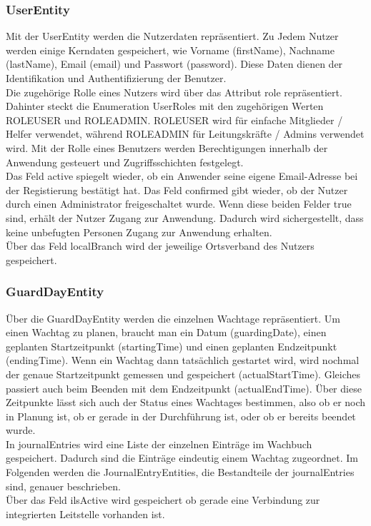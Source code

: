 \documentclass[fontsize=12pt,openright,oneside,paper=a4,BCOR=1cm]{scrbook}
\begin{document}
\subsubsection{UserEntity}
Mit der \glqq UserEntity\grqq{} werden die Nutzerdaten repräsentiert. Zu Jedem Nutzer werden einige Kerndaten gespeichert, wie Vorname (\glqq firstName\grqq{}), Nachname (\glqq lastName\grqq{}), Email (\glqq email\grqq{}) und Passwort (\glqq password\grqq{}). Diese Daten dienen der Identifikation und Authentifizierung der Benutzer. \\
Die zugehörige Rolle eines Nutzers wird über das Attribut \glqq role\grqq{} repräsentiert. Dahinter steckt die Enumeration \glqq UserRoles\grqq{} mit den zugehörigen Werten \glqq ROLE\textunderscore USER\grqq{} und \glqq ROLE\textunderscore ADMIN\grqq{}. \glqq ROLE\textunderscore USER\grqq{} wird für einfache \glqq Mitglieder / Helfer\grqq{} verwendet, während \glqq ROLE\textunderscore ADMIN\grqq{} für \glqq Leitungskräfte / Admins\grqq{} verwendet wird. Mit der Rolle eines Benutzers werden Berechtigungen innerhalb der Anwendung gesteuert und Zugriffsschichten festgelegt. \\ 
Das Feld \glqq active\grqq{} spiegelt wieder, ob ein Anwender seine eigene Email-Adresse bei der Registierung bestätigt hat. Das Feld \glqq confirmed\grqq{} gibt wieder, ob der Nutzer durch einen Administrator freigeschaltet wurde. Wenn diese beiden Felder \glqq true\grqq{} sind, erhält der Nutzer Zugang zur Anwendung. Dadurch wird sichergestellt, dass keine unbefugten Personen Zugang zur Anwendung erhalten. \\
Über das Feld \glqq localBranch\grqq{} wird der jeweilige Ortsverband des Nutzers gespeichert.

\subsubsection{GuardDayEntity}
Über die \glqq GuardDayEntity\grqq{} werden die einzelnen Wachtage repräsentiert. Um einen Wachtag zu planen, braucht man ein Datum (\glqq guardingDate\grqq{}), einen geplanten Startzeitpunkt (\glqq startingTime\grqq{}) und einen geplanten Endzeitpunkt (\glqq endingTime\grqq{}). Wenn ein Wachtag dann tatsächlich gestartet wird, wird nochmal der genaue Startzeitpunkt gemessen und gespeichert (\glqq actualStartTime\grqq{}). Gleiches passiert auch beim Beenden mit dem Endzeitpunkt (\glqq actualEndTime\grqq{}). Über diese Zeitpunkte lässt sich auch der Status eines Wachtages bestimmen, also ob er noch in Planung ist, ob er gerade in der Durchführung ist, oder ob er bereits beendet wurde. \\ 
In \glqq journalEntries\grqq{} wird eine Liste der einzelnen Einträge im Wachbuch gespeichert. Dadurch sind die Einträge eindeutig einem Wachtag zugeordnet. Im Folgenden werden die \glqq JournalEntryEntities\grqq{}, die Bestandteile der \glqq journalEntries\grqq{} sind, genauer beschrieben. \\
Über das Feld \glqq ilsActive\grqq{} wird gespeichert ob gerade eine Verbindung zur integrierten Leitstelle vorhanden ist.  
 
\end{document}

